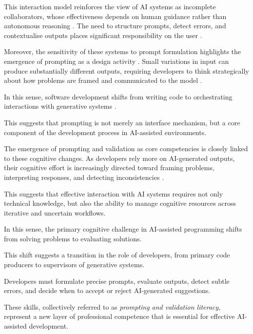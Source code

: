\documentclass[conference]{IEEEtran}
\begin{document}
This interaction model reinforces the view of AI systems as incomplete collaborators, whose effectiveness depends on human guidance rather than autonomous reasoning \cite{borg_echoes_2026, mendes_youre_2024}. The need to structure prompts, detect errors, and contextualise outputs places significant responsibility on the user \cite{bento_leveraging_2025}.

Moreover, the sensitivity of these systems to prompt formulation highlights the emergence of prompting as a design activity \cite{shirafuji_exploring_2023, denny_conversing_2023}. Small variations in input can produce substantially different outputs, requiring developers to think strategically about how problems are framed and communicated to the model \cite{chen_nlperturbator_2026, mastropaolo_robustness_2023}.

In this sense, software development shifts from writing code to orchestrating interactions with generative systems \cite{larbi_when_2025, fayed_prompt-driven_2026}.

This suggests that prompting is not merely an interface mechanism, but a core component of the development process in AI-assisted environments.

The emergence of prompting and validation as core competencies is closely linked to these cognitive changes. As developers rely more on AI-generated outputs, their cognitive effort is increasingly directed toward framing problems, interpreting responses, and detecting inconsistencies \cite{tang_study_2024, gardella_performance_2024}.

This suggests that effective interaction with AI systems requires not only technical knowledge, but also the ability to manage cognitive resources across iterative and uncertain workflows.

In this sense, the primary cognitive challenge in AI-assisted programming shifts from solving problems to evaluating solutions.

This shift suggests a transition in the role of developers, from primary code producers to supervisors of generative systems.

Developers must formulate precise prompts, evaluate outputs, detect subtle errors, and decide when to accept or reject AI-generated suggestions.

These skills, collectively referred to as \textit{prompting and validation literacy}, represent a new layer of professional competence that is essential for effective AI-assisted development.
\end{document}
